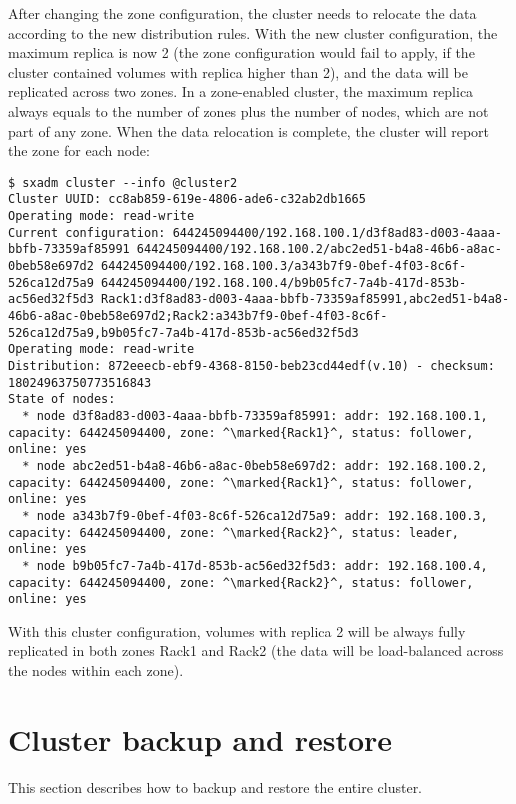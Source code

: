 After changing the zone configuration, the cluster needs to relocate the data
according to the new distribution rules. With the new cluster configuration,
the maximum replica is now 2 (the zone configuration would fail to apply, if
the cluster contained volumes with replica higher than 2), and the data will
be replicated across two zones. In a zone-enabled cluster, the maximum replica
always equals to the number of zones plus the number of nodes, which are not
part of any zone. When the data relocation is complete, the cluster will report
the zone for each node:
\begin{lstlisting}
$ sxadm cluster --info @cluster2
Cluster UUID: cc8ab859-619e-4806-ade6-c32ab2db1665
Operating mode: read-write
Current configuration: 644245094400/192.168.100.1/d3f8ad83-d003-4aaa-bbfb-73359af85991 644245094400/192.168.100.2/abc2ed51-b4a8-46b6-a8ac-0beb58e697d2 644245094400/192.168.100.3/a343b7f9-0bef-4f03-8c6f-526ca12d75a9 644245094400/192.168.100.4/b9b05fc7-7a4b-417d-853b-ac56ed32f5d3 Rack1:d3f8ad83-d003-4aaa-bbfb-73359af85991,abc2ed51-b4a8-46b6-a8ac-0beb58e697d2;Rack2:a343b7f9-0bef-4f03-8c6f-526ca12d75a9,b9b05fc7-7a4b-417d-853b-ac56ed32f5d3
Operating mode: read-write
Distribution: 872eeecb-ebf9-4368-8150-beb23cd44edf(v.10) - checksum: 18024963750773516843
State of nodes:
  * node d3f8ad83-d003-4aaa-bbfb-73359af85991: addr: 192.168.100.1, capacity: 644245094400, zone: ^\marked{Rack1}^, status: follower, online: yes
  * node abc2ed51-b4a8-46b6-a8ac-0beb58e697d2: addr: 192.168.100.2, capacity: 644245094400, zone: ^\marked{Rack1}^, status: follower, online: yes
  * node a343b7f9-0bef-4f03-8c6f-526ca12d75a9: addr: 192.168.100.3, capacity: 644245094400, zone: ^\marked{Rack2}^, status: leader, online: yes
  * node b9b05fc7-7a4b-417d-853b-ac56ed32f5d3: addr: 192.168.100.4, capacity: 644245094400, zone: ^\marked{Rack2}^, status: follower, online: yes
\end{lstlisting}
With this cluster configuration, volumes with replica 2 will be always fully
replicated in both zones Rack1 and Rack2 (the data will be load-balanced across
the nodes within each zone).

\section{Cluster backup and restore}
This section describes how to backup and restore the entire cluster.

